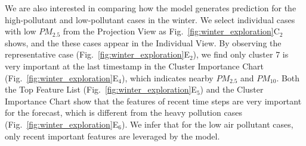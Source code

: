 We are also interested in comparing how the model generates prediction for the high-pollutant and low-pollutant cases in the winter. 
We select individual cases with low $PM_{2.5}$ from the Projection View as Fig.~\ref{fig:winter_exploration}C$_2$ shows, and the these cases appear in the Individual View. 
By observing the representative case (Fig.~\ref{fig:winter_exploration}E$_2$), we find only cluster 7 is very important at the last timestamp in the Cluster Importance Chart (Fig.~\ref{fig:winter_exploration}E$_4$), which indicates nearby $PM_{2.5}$ and $PM_{10}$. 
Both the Top Feature List (Fig.~\ref{fig:winter_exploration}E$_5$) and the Cluster Importance Chart show that the features of recent time steps are very important for the forecast, which is different from the heavy pollution cases (Fig.~\ref{fig:winter_exploration}E$_6$). 
We infer that for the low air pollutant cases, only recent important features are leveraged by the model. 

